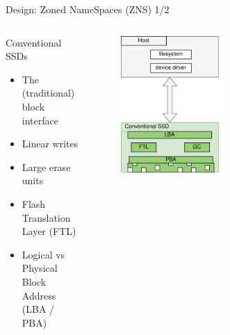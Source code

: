 \documentclass[aspectratio=169]{beamer}
\begin{document}
\begin{frame}{Design: Zoned NameSpaces (ZNS) 1/2}
    \begin{columns}
        \begin{column}{0.45\textwidth}
            \footnotesize
            Conventional SSDs
            \begin{itemize}
                \item The (traditional) block interface
                \item Linear writes
                \item Large erase units
                \item Flash Translation Layer (FTL)
                \item Logical vs Physical Block Address \\ (LBA / PBA)
            \end{itemize}
        \end{column}
        \begin{column}{0.55\textwidth}
            \begingroup
            \small
            \begin{figure}
                \centering
                \includegraphics[width=0.5\textwidth]{resources/images/conventional.png}
            \end{figure}
            \endgroup
        \end{column}
    \end{columns}
\end{frame}
\end{document}
